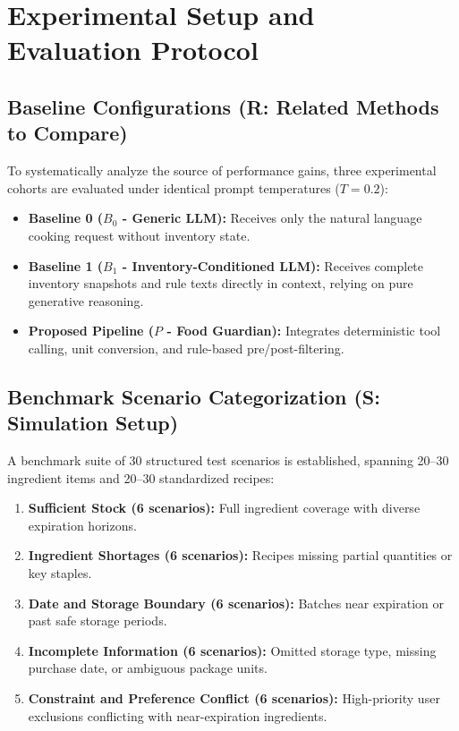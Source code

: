 \section{Experimental Setup and Evaluation Protocol}

\subsection{Baseline Configurations (R: Related Methods to Compare)}
To systematically analyze the source of performance gains, three experimental cohorts are evaluated under identical prompt temperatures ($T=0.2$):
\begin{itemize}
    \item \textbf{Baseline 0 ($B_0$ - Generic LLM):} Receives only the natural language cooking request without inventory state.
    \item \textbf{Baseline 1 ($B_1$ - Inventory-Conditioned LLM):} Receives complete inventory snapshots and rule texts directly in context, relying on pure generative reasoning.
    \item \textbf{Proposed Pipeline ($P$ - Food Guardian):} Integrates deterministic tool calling, unit conversion, and rule-based pre/post-filtering.
\end{itemize}

\subsection{Benchmark Scenario Categorization (S: Simulation Setup)}
A benchmark suite of 30 structured test scenarios is established, spanning 20--30 ingredient items and 20--30 standardized recipes:
\begin{enumerate}
    \item \textbf{Sufficient Stock (6 scenarios):} Full ingredient coverage with diverse expiration horizons.
    \item \textbf{Ingredient Shortages (6 scenarios):} Recipes missing partial quantities or key staples.
    \item \textbf{Date and Storage Boundary (6 scenarios):} Batches near expiration or past safe storage periods.
    \item \textbf{Incomplete Information (6 scenarios):} Omitted storage type, missing purchase date, or ambiguous package units.
    \item \textbf{Constraint and Preference Conflict (6 scenarios):} High-priority user exclusions conflicting with near-expiration ingredients.
\end{enumerate}


